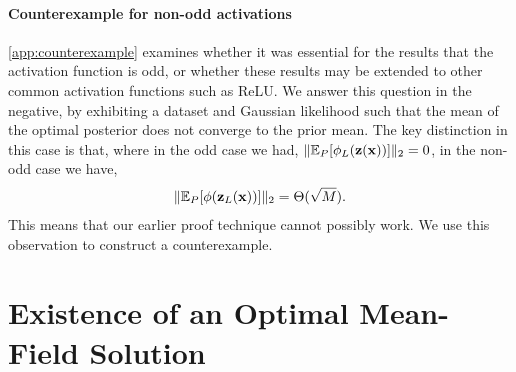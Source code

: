 \documentclass[twoside]{article}
\newcommand{\vx}{\mathbf{x}}
\newcommand{\vz}{\mathbf{z}}
\newcommand{\E}{\mathbb{E}}
\renewcommand{\P}{\mathbb{P}}
\renewcommand{\P}{\ensuremath{P}}
\DeclarePairedDelimiter\norm{\|}{\|}             %
\theoremstyle{theoremstyle}
\begin{document}
\paragraph{Counterexample for non-odd activations}
\cref{app:counterexample} examines whether it was essential for the results that the activation function is odd, or whether these results may be extended to other common activation functions such as ReLU. We answer this question in the negative, by exhibiting a dataset and Gaussian likelihood such that the mean of the optimal posterior does not converge to the prior mean. The key distinction in this case is that, where in the odd case we had,  $\norm{\E_{\P}[\phi_L(\vz(\vx))]}_2 =0$, in the non-odd case we have, 
\begin{align}
    \norm{\E_{\P}[\phi(\vz_L(\vx))]}_2 = \Theta(\sqrt{M}). 
\end{align}
This means that our earlier proof technique cannot possibly work. We use this observation to construct a counterexample.

\section{Existence of an Optimal Mean-Field Solution}
\label{app:existence-mf-solution}
\end{document}
